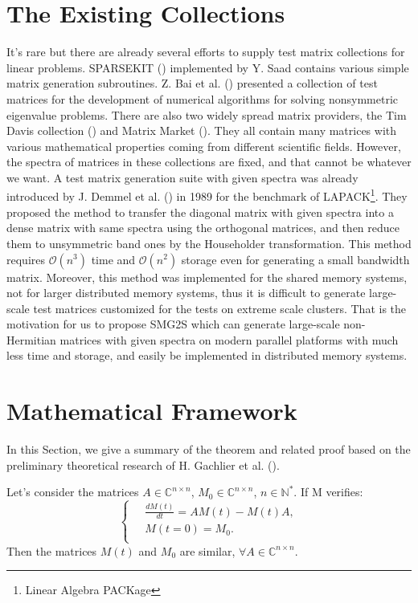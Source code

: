 \section{The Existing Collections} \label{Existing Collections}

It's rare but there are already several efforts to supply test matrix collections for linear problems. SPARSEKIT (\cite{saad1994sparsekit}) implemented by Y. Saad contains various simple matrix generation subroutines. Z. Bai et al. (\cite{bai1996test}) presented a collection of test matrices for the development of numerical algorithms for solving nonsymmetric eigenvalue problems. There are also two widely spread matrix providers, the Tim Davis collection (\cite{davis2011university}) and Matrix Market (\cite{boisvert1997matrix}). They all contain many matrices with various mathematical properties coming from different scientific fields. However, the spectra of matrices in these collections are fixed, and that cannot be whatever we want. A test matrix generation suite with given spectra was already introduced by J. Demmel et al. (\cite{demmel1989test}) in 1989 for the benchmark of LAPACK\footnote{Linear Algebra PACKage}. They proposed the method to transfer the diagonal matrix with given spectra into a dense matrix with same spectra using the orthogonal matrices, and then reduce them to unsymmetric band ones by the Householder transformation. This method requires $\mathcal{O}(n^3)$ time and $\mathcal{O}(n^2)$ storage even for generating a small bandwidth matrix. Moreover, this method was implemented for the shared memory systems, not for larger distributed memory systems, thus it is difficult to generate large-scale test matrices customized for the tests on extreme scale clusters. That is the motivation for us to propose SMG2S which can generate large-scale non-Hermitian matrices with given spectra on modern parallel platforms with much less time and storage, and easily be implemented in distributed memory systems.

\section{Mathematical Framework}

In this Section, we give a summary of the theorem and related proof based on the preliminary theoretical research of H. Gachlier et al. (\cite{galichergenerate}).


\begin{theorem}
	\label{theo1}
	Let's consider the matrices $A \in \mathbb{C}^{n \times n}$, $M_0  \in \mathbb{C}^{n \times n}$, $n \in \mathbb{N}^*$. If M verifies: 
	\[
	\left\{\
	\begin{aligned}
	&\frac{dM(t)}{dt} = AM(t) - M(t)A, \\
	&M(t=0) = M_0. \\ 
	\end{aligned}
	\right.
	\]
	Then the matrices $M(t)$ and $M_0$ are similar, $\forall A \in \mathbb{C}^{n \times n}$. 
\end{theorem}

